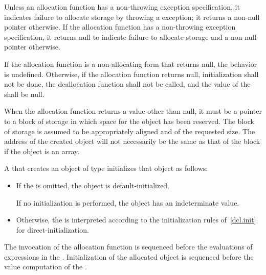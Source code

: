 \pnum
\begin{note}
Unless an allocation function has a non-throwing
exception specification,
it indicates failure to allocate storage by throwing a
%
%
exception;
it returns a non-null pointer otherwise. If the allocation function
has a non-throwing exception specification,
it returns null to indicate failure to allocate storage
and a non-null pointer otherwise.
\end{note}
If the allocation function is a non-allocating
form that returns null,
the behavior is undefined.
Otherwise,
if the allocation function returns null, initialization shall not be
done, the deallocation function shall not be called, and the value of
the  shall be null.

\pnum
\begin{note}
When the allocation function returns a value other than null, it must be
a pointer to a block of storage in which space for the object has been
reserved. The block of storage is assumed to be
appropriately aligned
and of the requested size. The address of the created object will not
necessarily be the same as that of the block if the object is an array.
\end{note}

\pnum
{}%
%
%
%
A  that creates an object of type 
initializes that object as follows:

\begin{itemize}
\item If the  is omitted, the object is
default-initialized.
\begin{note}
If no initialization
is performed, the object has an indeterminate value.
\end{note}

\item Otherwise, the  is interpreted according to
the initialization rules of~\ref{dcl.init} for direct-initialization.
\end{itemize}

\pnum
{}%
%
The invocation of the allocation function is sequenced before
the evaluations of expressions in the . Initialization of
the allocated object is sequenced before the
%
value computation of the
.

